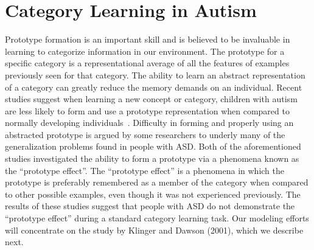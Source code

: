 %
%

\section{Category Learning in Autism}

Prototype formation is an important skill and is believed to be invaluable in learning to categorize information in our environment.  The prototype for a specific category is a representational average of all the features of examples previously seen for that category.  The ability to learn an abstract representation of a category can greatly reduce the memory demands on an individual. Recent studies suggest when learning a new concept or category, children with autism are less likely to form and use a prototype representation when compared to normally developing individuals~\cite{RefWorks:113,StraussMS:2009:Prototype}.  Difficulty in forming and properly using an abstracted prototype is argued by some researchers to underly many of the generalization problems found in people with ASD.   Both of the aforementioned studies investigated the ability to form a prototype via a phenomena known as the ``prototype effect''.  The ``prototype effect'' is a phenomena in which the prototype is preferably remembered as a member of the category when compared to other possible examples, even though it was not experienced previously.  The results of these studies suggest that people with ASD do not demonstrate the ``prototype effect'' during a standard category learning task.  Our modeling efforts will concentrate on the study by Klinger and Dawson (2001), which we describe next. 

